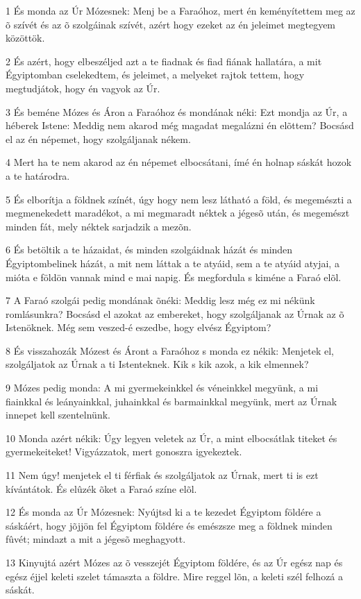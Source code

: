 \par 1 És monda az Úr Mózesnek: Menj be a Faraóhoz, mert én keményítettem meg az õ szívét és az õ szolgáinak szívét, azért hogy ezeket az én jeleimet megtegyem közöttök.
\par 2 És azért, hogy elbeszéljed azt a te fiadnak és fiad fiának hallatára, a mit Égyiptomban cselekedtem, és jeleimet, a melyeket rajtok tettem, hogy megtudjátok, hogy én vagyok az Úr.
\par 3 És beméne Mózes és Áron a Faraóhoz és mondának néki: Ezt mondja az Úr, a héberek Istene: Meddig nem akarod még magadat megalázni én elõttem? Bocsásd el az én népemet, hogy szolgáljanak nékem.
\par 4 Mert ha te nem akarod az én népemet elbocsátani, ímé én holnap sáskát hozok a te határodra.
\par 5 És elborítja a földnek színét, úgy hogy nem lesz látható a föld, és megemészti a megmenekedett maradékot, a mi megmaradt néktek a jégesõ után, és megemészt minden fát, mely néktek sarjadzik a mezõn.
\par 6 És betöltik a te házaidat, és minden szolgáidnak házát és minden Égyiptombelinek házát, a mit nem láttak a te atyáid, sem a te atyáid atyjai, a mióta e földön vannak mind e mai napig. És megfordula s kiméne a Faraó elõl.
\par 7 A Faraó szolgái pedig mondának õnéki: Meddig lesz még ez mi nékünk romlásunkra? Bocsásd el azokat az embereket, hogy szolgáljanak az Úrnak az õ Istenöknek. Még sem veszed-é eszedbe, hogy elvész Égyiptom?
\par 8 És visszahozák Mózest és Áront a Faraóhoz s monda ez nékik: Menjetek el, szolgáljatok az Úrnak a ti Istenteknek. Kik s kik azok, a kik elmennek?
\par 9 Mózes pedig monda: A mi gyermekeinkkel és véneinkkel megyünk, a mi fiainkkal és leányainkkal, juhainkkal és barmainkkal megyünk, mert az Úrnak innepet kell szentelnünk.
\par 10 Monda azért nékik: Úgy legyen veletek az Úr, a mint elbocsátlak titeket és gyermekeiteket! Vigyázzatok, mert gonoszra igyekeztek.
\par 11 Nem úgy! menjetek el ti férfiak és szolgáljatok az Úrnak, mert ti is ezt kívántátok. És elûzék õket a Faraó színe elõl.
\par 12 És monda az Úr Mózesnek: Nyújtsd ki a te kezedet Égyiptom földére a sáskáért, hogy jõjjön fel Égyiptom földére és emészsze meg a földnek minden fûvét; mindazt a mit a jégesõ meghagyott.
\par 13 Kinyujtá azért Mózes az õ vesszejét Égyiptom földére, és az Úr egész nap és egész éjjel keleti szelet támaszta a földre. Mire reggel lõn, a keleti szél felhozá a sáskát.
